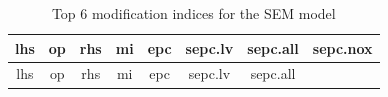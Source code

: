 \documentclass[]{article}
\theoremstyle{definition}
\theoremstyle{definition}
\theoremstyle{definition}
\theoremstyle{remark}
\begin{document}
\begin{longtable}[]{@{}cccccccc@{}}
\caption{Top 6 modification indices for the SEM model}\tabularnewline
\toprule
\begin{minipage}[b]{0.11\columnwidth}\centering\strut
lhs\strut
\end{minipage} & \begin{minipage}[b]{0.05\columnwidth}\centering\strut
op\strut
\end{minipage} & \begin{minipage}[b]{0.12\columnwidth}\centering\strut
rhs\strut
\end{minipage} & \begin{minipage}[b]{0.08\columnwidth}\centering\strut
mi\strut
\end{minipage} & \begin{minipage}[b]{0.10\columnwidth}\centering\strut
epc\strut
\end{minipage} & \begin{minipage}[b]{0.10\columnwidth}\centering\strut
sepc.lv\strut
\end{minipage} & \begin{minipage}[b]{0.11\columnwidth}\centering\strut
sepc.all\strut
\end{minipage} & \begin{minipage}[b]{0.11\columnwidth}\centering\strut
sepc.nox\strut
\end{minipage}\tabularnewline
\midrule
\endfirsthead
\toprule
\begin{minipage}[b]{0.11\columnwidth}\centering\strut
lhs\strut
\end{minipage} & \begin{minipage}[b]{0.05\columnwidth}\centering\strut
op\strut
\end{minipage} & \begin{minipage}[b]{0.12\columnwidth}\centering\strut
rhs\strut
\end{minipage} & \begin{minipage}[b]{0.08\columnwidth}\centering\strut
mi\strut
\end{minipage} & \begin{minipage}[b]{0.10\columnwidth}\centering\strut
epc\strut
\end{minipage} & \begin{minipage}[b]{0.10\columnwidth}\centering\strut
sepc.lv\strut
\end{minipage} & \begin{minipage}[b]{0.11\columnwidth}\centering\strut
sepc.all\strut
\end{minipage} & \begin{minipage}[b]{0.11\columnwidth}\centering\strut

\end{minipage}
\end{longtable}
\end{document}
